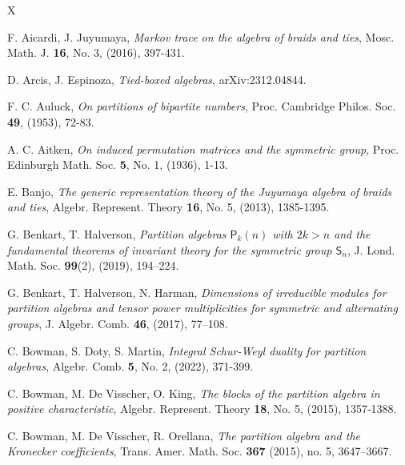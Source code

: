 \documentclass[10pt,hidelinks]{article}
\numberwithin{equation}{section}
\begin{document}
\begin{thebibliography}{X}



F. Aicardi, J. Juyumaya, 
{\it Markov trace on the algebra of braids and ties}, 
Mosc. Math. J. {\bf 16}, No. 3, (2016), 397-431. 


D. Arcis, J. Espinoza, 
{\it Tied-boxed algebras}, arXiv:2312.04844. 


  

  
F. C. Auluck, 
\textit{On partitions of bipartite numbers}, Proc. Cambridge Philos. Soc. {\bf 49}, (1953), 72-83.


A. C. Aitken, 
  \textit{On induced permutation matrices and the symmetric group},
  Proc. Edinburgh Math. Soc. {\bf 5}, No. 1, (1936), 1-13.


  

E. Banjo, {\it 
The generic representation theory of the Juyumaya algebra of braids and ties}, 
Algebr. Represent. Theory {\bf 16}, No. 5, (2013), 1385-1395. 


{\color{black}
G. Benkart, T. Halverson, \textit{Partition algebras $ {\mathsf P}_k(n) $ with $2k > n $ and the
fundamental theorems of invariant theory for the symmetric group $ {\mathsf S}_n $}, J. Lond. Math.
Soc. {\bf 99}(2), (2019), 194–224.}



G. Benkart, T. Halverson, N. Harman, \textit{Dimensions of irreducible modules for partition algebras and tensor power multiplicities for symmetric and alternating groups},
  J. Algebr. Comb. {\bf 46}, (2017), 77–108.



  

C. Bowman, S. Doty, S. Martin, \textit{Integral Schur-Weyl duality for partition algebras}, 
Algebr. Comb. {\bf 5}, No. 2, (2022), 371-399.


C. Bowman, M. De Visscher, O. King, 
\textit{The blocks of the partition algebra in positive characteristic}, 
Algebr. Represent. Theory {\bf 18}, No. 5, (2015), 1357-1388. 


C. Bowman, M. De Visscher, R. Orellana, \textit{The partition algebra and the Kronecker coefficients}, 
Trans. Amer. Math. Soc. {\bf 367} (2015), no. 5, 3647–3667.



{}





\end{thebibliography}
\end{document}
